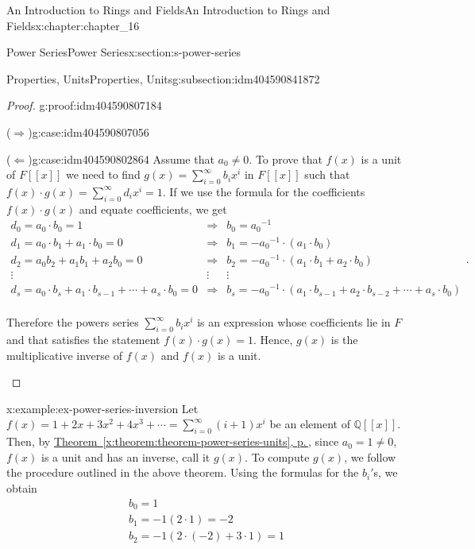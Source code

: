 \documentclass[twoside,10pt,]{book}
\newcommand{\xreffont}{\relax}
\newcommand{\forwardimplication}{($\Rightarrow$)}
\newcommand{\backwardimplication}{($\Leftarrow$)}
\numberwithin{equation}{section}
\begin{document}
\begin{chapterptx}{An Introduction to Rings and Fields}{}{An Introduction to Rings and Fields}{}{}{x:chapter:chapter_16}
\begin{sectionptx}{Power Series}{}{Power Series}{}{}{x:section:s-power-series}
\begin{subsectionptx}{Properties, Units}{}{Properties, Units}{}{}{g:subsection:idm404590841872}
\begin{proof}{}{g:proof:idm404590807184}
\begin{case}{\forwardimplication}{}{g:case:idm404590807056}
\end{case}
\begin{case}{\backwardimplication}{}{g:case:idm404590802864}
Assume that \(a_0\neq 0\). To prove that \(f(x)\) is a unit of \(F[[x]]\) we need to find \(g(x)=\sum_{i=0}^{\infty } b_i x^i\) in \(F[[x]]\) such that \(f(x) \cdot  g(x) =\sum_{i=0}^{\infty } d_i x^i= 1\). If we use the formula for the coefficients \(f(x) \cdot g(x)\) and equate coefficients, we get%
\begin{equation*}
\begin{array}{lll}
d_0= a_0\cdot  b_0= 1 &\Rightarrow & b_0=a_0{}^{-1} \\
d_1= a_0\cdot b_1+ a_1\cdot b_0=0&\Rightarrow & b_1= -a_0{}^{-1}\cdot \left(a_1\cdot b_0\right) \\
d_2=a_0 b_2+a_1 b_1+a_2 b_0=0 & \Rightarrow & b_2=-a_0{}^{-1}\cdot \left(a_1\cdot b_1+ a_2\cdot b_0\right)\\
\vdots  & \vdots & \vdots \\
d_s= a_0\cdot b_s+ a_1\cdot b_{s-1}+ \cdots +a_s\cdot b_0 =0 &  \Rightarrow &b_s= -a_0{}^{-1}\cdot \left(a_1\cdot b_{s-1}+ a_2\cdot b_{s-2}+ \cdots +a_s\cdot b_0\right)\\
\end{array}\text{.}
\end{equation*}
%
\par
Therefore the powers series \(\sum_{i=0}^{\infty } b_i x^i\) is an expression whose coefficients lie in \(F\) and that satisfies the statement \(f(x)
\cdot  g(x) = 1\). Hence, \(g(x)\) is the multiplicative inverse of \(f(x)\) and \(f(x)\) is a unit.%
\end{case}
\end{proof}
\begin{example}{}{x:example:ex-power-series-inversion}%
Let \(f(x) =1 + 2x + 3 x^2+ 4 x^3+ \cdots =\sum_{i=0}^{\infty } (i+1) x^i\) be an element of \(\mathbb{Q}[[x]]\). Then, by \hyperref[x:theorem:theorem-power-series-units]{Theorem~{\xreffont\ref{x:theorem:theorem-power-series-units}}, p.\,\pageref{x:theorem:theorem-power-series-units}}, since \(a_0=1\neq 0\),  \(f(x)\) is a unit and has an inverse, call it \(g(x)\). To compute \(g(x)\), we follow the procedure outlined in the above theorem.  Using the formulas for the \(b_i'\)s, we obtain%
\begin{equation*}
\begin{array}{c}
b_0 = 1\\
b_1= -1(2\cdot 1)=-2\\
b_2= -1(2\cdot (-2)+ 3\cdot 1) = 1\\

\end{array}
\end{equation*}
\end{example}
\end{subsectionptx}
\end{sectionptx}
\end{chapterptx}
\end{document}
